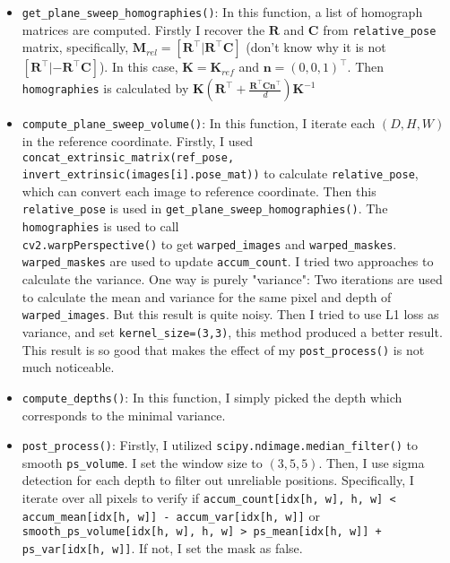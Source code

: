 \begin{itemize}
    \item \texttt{get\_plane\_sweep\_homographies()}: In this function, a list of homograph matrices are computed. Firstly I recover the $\textbf{R}$ and $\textbf{C}$ from \texttt{relative\_pose} matrix, specifically, $\textbf{M}_{rel} = [\textbf{R}^\intercal|\textbf{R}^\intercal \textbf{C}]$ (don't know why it is not $[\textbf{R}^\intercal|-\textbf{R}^\intercal \textbf{C}]$). In this case, $\mathbf{K}=\mathbf{K}_{ref}$ and $\textbf{n}=(0,0,1)^\intercal$. Then \texttt{homographies} is calculated by $\mathbf{K}(\mathbf{R}^\intercal + \frac{\mathbf{R}^\intercal \mathbf{C} \mathbf{n}^\intercal}{d})\mathbf{K}^{-1}$
    
    \item \texttt{compute\_plane\_sweep\_volume()}: In this function, I iterate each $(D, H, W)$ in the reference coordinate. Firstly, I used \texttt{concat\_extrinsic\_matrix(ref\_pose,\\
    invert\_extrinsic(images[i].pose\_mat))} to calculate \texttt{relative\_pose}, which can convert each image to reference coordinate. Then this \texttt{relative\_pose} is used in \texttt{get\_plane\_sweep\_homographies()}. The \texttt{homographies} is used to call \\
    \texttt{cv2.warpPerspective()} to get \texttt{warped\_images} and \texttt{warped\_maskes}. \\ \texttt{warped\_maskes} are used to update \texttt{accum\_count}. I tried two approaches to calculate the variance. One way is purely "variance": Two iterations are used to calculate the mean and variance for the same pixel and depth of \texttt{warped\_images}. But this result is quite noisy. Then I tried to use L1 loss as variance, and set \texttt{kernel\_size=(3,3)}, this method produced a better result. This result is so good that makes the effect of my \texttt{post\_process()} is not much noticeable.

    \item \texttt{compute\_depths()}: In this function, I simply picked the depth which corresponds to the minimal variance.
    
    \item \texttt{post\_process()}: Firstly, I utilized \texttt{scipy.ndimage.median\_filter()} to smooth \texttt{ps\_volume}. I set the window size to $(3,5,5)$. Then, I use sigma detection for each depth to filter out unreliable positions. Specifically, I iterate over all pixels to verify if \texttt{accum\_count[idx[h, w], h, w] < accum\_mean[idx[h, w]] - accum\_var[idx[h, w]]} or \texttt{smooth\_ps\_volume[idx[h, w], h, w] > ps\_mean[idx[h, w]] + ps\_var[idx[h, w]]}. If not, I set the mask as false.



\end{itemize}
